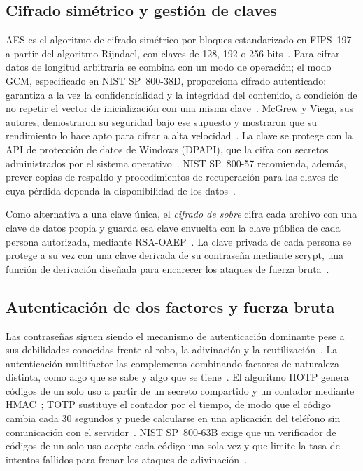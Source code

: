 \documentclass[conference]{IEEEtran}
\begin{document}
\subsection{Cifrado simétrico y gestión de claves}
AES es el algoritmo de cifrado simétrico por bloques estandarizado en FIPS~197 a partir del algoritmo Rijndael, con claves de 128, 192 o 256 bits~\cite{fips197,daemen}. Para cifrar datos de longitud arbitraria se combina con un modo de operación; el modo GCM, especificado en NIST SP~800-38D, proporciona cifrado autenticado: garantiza a la vez la confidencialidad y la integridad del contenido, a condición de no repetir el vector de inicialización con una misma clave~\cite{nist38d}. McGrew y Viega, sus autores, demostraron su seguridad bajo ese supuesto y mostraron que su rendimiento lo hace apto para cifrar a alta velocidad~\cite{mcgrew}. La clave se protege con la API de protección de datos de Windows (DPAPI), que la cifra con secretos administrados por el sistema operativo~\cite{msdpapi}. NIST SP~800-57 recomienda, además, prever copias de respaldo y procedimientos de recuperación para las claves de cuya pérdida dependa la disponibilidad de los datos~\cite{sp80057}.

Como alternativa a una clave única, el \textit{cifrado de sobre} cifra cada archivo con una clave de datos propia y guarda esa clave envuelta con la clave pública de cada persona autorizada, mediante RSA-OAEP~\cite{rfc8017}. La clave privada de cada persona se protege a su vez con una clave derivada de su contraseña mediante scrypt, una función de derivación diseñada para encarecer los ataques de fuerza bruta~\cite{rfc7914}.

\subsection{Autenticación de dos factores y fuerza bruta}
Las contraseñas siguen siendo el mecanismo de autenticación dominante pese a sus debilidades conocidas frente al robo, la adivinación y la reutilización~\cite{bonneau}. La autenticación multifactor las complementa combinando factores de naturaleza distinta, como algo que se sabe y algo que se tiene~\cite{ometov}. El algoritmo HOTP genera códigos de un solo uso a partir de un secreto compartido y un contador mediante HMAC~\cite{rfc4226}; TOTP sustituye el contador por el tiempo, de modo que el código cambia cada 30 segundos y puede calcularse en una aplicación del teléfono sin comunicación con el servidor~\cite{rfc6238}. NIST SP~800-63B exige que un verificador de códigos de un solo uso acepte cada código una sola vez y que limite la tasa de intentos fallidos para frenar los ataques de adivinación~\cite{sp80063b}.
\end{document}
